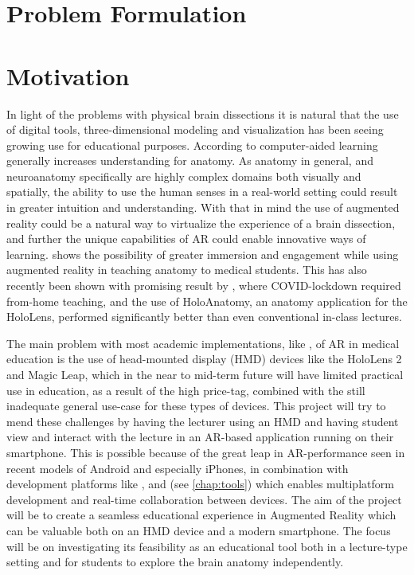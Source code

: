 \section{Problem Formulation}

\section{Motivation}

In light of the problems with physical brain dissections it is natural that the use of digital tools, three-dimensional modeling and visualization has been seeing growing use for educational purposes. 
According to \citep{Dalgarno2010} computer-aided learning generally increases understanding for anatomy. As anatomy in general, and neuroanatomy specifically are highly complex domains both visually and spatially, the ability to use the human senses in a real-world setting could result in greater intuition and understanding. With that in mind the use of augmented reality could be a natural way to virtualize the experience of a brain dissection, and further the unique capabilities of AR could enable innovative ways of learning. \citep{Moro2017} shows the possibility of greater immersion and engagement while using augmented reality in teaching anatomy to medical students. This has also recently been shown with promising result by  \citep{Wish2020}, where COVID-lockdown required from-home teaching, and the use of HoloAnatomy, an anatomy application for the HoloLens, performed significantly better than even conventional in-class lectures.

The main problem with most academic implementations, like \citep{Wish2020}, of AR in medical education is the use of head-mounted display (HMD) devices like the HoloLens 2 and Magic Leap, which in the near to mid-term future will have limited practical use in education, as a result of the high price-tag, combined with the still inadequate general use-case for these types of devices.
This project will try to mend these challenges by having the lecturer using an HMD and having student view and interact with the lecture in an AR-based application running on their smartphone. 
This is possible because of the great leap in AR-performance seen in recent models of Android and especially iPhones, in combination with development platforms like ,  and  (see \autoref{chap:tools}) which enables multiplatform development and real-time collaboration between devices. 
The aim of the project will be to create a seamless educational experience in Augmented Reality which can be valuable both on an HMD device and a modern smartphone. The focus will be on investigating its feasibility as an educational tool both in a lecture-type setting and for students to explore the brain anatomy independently. 

